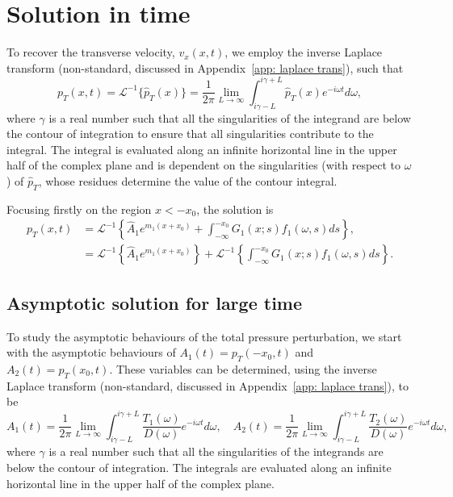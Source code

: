 \documentclass[12pt]{article}
\begin{document}
\section{Solution in time}
To recover the transverse velocity, $v_x(x, t)$, we employ the inverse Laplace transform (non-standard, discussed in Appendix~\ref{app: laplace trans}), such that
\begin{equation}
p_T(x,t) = \mathcal{L}^{-1}\{\hat{p}_T(x)\} = \frac{1}{2\pi} \lim_{L \to \infty} \int_{i\gamma - L}^{i\gamma + L} \hat{p}_T(x) e^{-i\omega t} d\omega,
\label{laplace transform}
\end{equation}
where $\gamma$ is a real number such that all the singularities of the integrand are below the contour of integration to ensure that all singularities contribute to the integral. The integral is evaluated along an infinite horizontal line in the upper half of the complex plane and is dependent on the singularities (with respect to $\omega$) of $\hat{p}_T$, whose residues determine the value of the contour integral.

Focusing firstly on the region $x < -x_0$, the solution is
\newcommand{\e}{\epsilon}
\begin{align}
p_T(x, t) &= \mathcal{L}^{-1} \left\{ \hat{A}_1 e^{m_1(x + x_0)} + \int_{-\infty}^{-x_0} G_1(x; s)f_1(\omega, s)ds \right\}, \\
&= \mathcal{L}^{-1} \left\{ \hat{A}_1 e^{m_1(x + x_0)} \right\} + \mathcal{L}^{-1} \left\{ \int_{-\infty}^{-x_0} G_1(x; s)f_1(\omega, s)ds \right\}.
\end{align}


\subsection{Asymptotic solution for large time}
To study the asymptotic behaviours of the total pressure perturbation, we start with the asymptotic behaviours of $A_1(t) = p_T(-x_0, t)$ and $A_2(t) = p_T(x_0, t)$. These variables can be determined, using the inverse Laplace transform (non-standard, discussed in Appendix~\ref{app: laplace trans}), to be
\begin{equation}
A_1(t) = \frac{1}{2\pi} \lim_{L \to \infty} \int_{i\gamma - L}^{i\gamma + L} \frac{T_1(\omega)}{D(\omega)} e^{-i\omega t} d\omega, \quad A_2(t) = \frac{1}{2\pi} \lim_{L \to \infty} \int_{i\gamma - L}^{i\gamma + L} \frac{T_2(\omega)}{D(\omega)} e^{-i\omega t} d\omega,
\label{A inv laplace}
\end{equation}
where $\gamma$ is a real number such that all the singularities of the integrands are below the contour of integration. The integrals are evaluated along an infinite horizontal line in the upper half of the complex plane.
\end{document}
